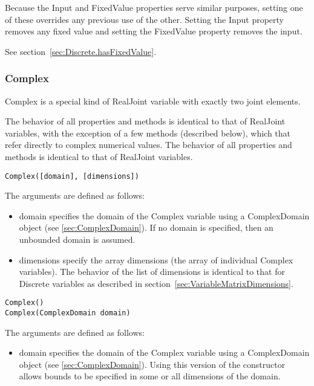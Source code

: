 Because the Input and FixedValue properties serve similar purposes, setting one of these overrides any previous use of the other.  Setting the Input property removes any fixed value and setting the FixedValue property removes the input.




See section~\ref{sec:Discrete.hasFixedValue}.



\subsubsection{Complex}

Complex is a special kind of RealJoint variable with exactly two joint elements.

\ifmatlab
The behavior of all properties and methods is identical to that of RealJoint variables, with the exception of a few methods (described below), which that refer directly to complex numerical values. 
\fi
\ifjava
The behavior of all properties and methods is identical to that of RealJoint variables.
\fi


\ifmatlab
\begin{lstlisting}
Complex([domain], [dimensions])
\end{lstlisting}

The arguments are defined as follows:

\begin{itemize}
\item domain specifies the domain of the Complex variable using a ComplexDomain object (see \ref{sec:ComplexDomain}).  If no domain is specified, then an unbounded domain is assumed.
\item dimensions specify the array dimensions (the array of individual Complex variables).  The behavior of the list of dimensions is identical to that for Discrete variables as described in section~\ref{sec:VariableMatrixDimensions}.
\end{itemize}

\fi

\ifjava
\begin{lstlisting}
Complex()
Complex(ComplexDomain domain)
\end{lstlisting}

The arguments are defined as follows:

\begin{itemize}
\item domain specifies the domain of the Complex variable using a ComplexDomain object (see \ref{sec:ComplexDomain}).  Using this version of the constructor allows bounds to be specified in some or all dimensions of the domain.
\end{itemize}
\fi

